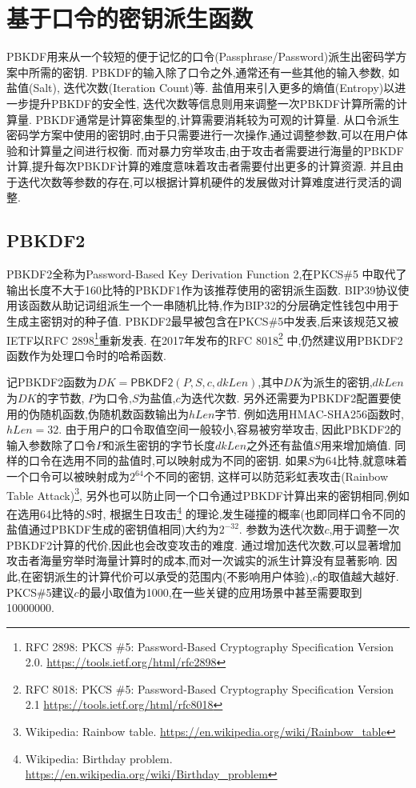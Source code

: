 
\section{基于口令的密钥派生函数}

PBKDF用来从一个较短的便于记忆的口令(Passphrase/Password)派生出密码学方案中所需的密钥.
PBKDF的输入除了口令之外,通常还有一些其他的输入参数, 如盐值(Salt), 迭代次数(Iteration Count)等.
盐值用来引入更多的熵值(Entropy)以进一步提升PBKDF的安全性, 迭代次数等信息则用来调整一次PBKDF计算所需的计算量.
PBKDF通常是计算密集型的,计算需要消耗较为可观的计算量.
从口令派生密码学方案中使用的密钥时,由于只需要进行一次操作,通过调整参数,可以在用户体验和计算量之间进行权衡.
而对暴力穷举攻击,由于攻击者需要进行海量的PBKDF计算,提升每次PBKDF计算的难度意味着攻击者需要付出更多的计算资源.
并且由于迭代次数等参数的存在,可以根据计算机硬件的发展做对计算难度进行灵活的调整.

\subsection{PBKDF2}
PBKDF2全称为Password-Based Key Derivation Function 2,在PKCS\#5
中取代了输出长度不大于160比特的PBKDF1作为该推荐使用的密钥派生函数.
BIP39协议使用该函数从助记词组派生一个一串随机比特,作为BIP32的分层确定性钱包中用于生成主密钥对的种子值.
PBKDF2最早被包含在PKCS\#5中发表,后来该规范又被IETF以RFC 
2898\footnote{
RFC 2898: PKCS \#5: Password-Based Cryptography Specification Version 2.0.
\url{https://tools.ietf.org/html/rfc2898}}重新发表.
在2017年发布的RFC 8018\footnote{
RFC 8018: PKCS \#5: Password-Based Cryptography Specification Version 2.1 \url{https://tools.ietf.org/html/rfc8018}}
中,仍然建议用PBKDF2函数作为处理口令时的哈希函数.

记PBKDF2函数为$DK = \textsf{PBKDF2}(P, S, c, dkLen)$,其中$DK$为派生的密钥,$dkLen$为$DK$的字节数,
$P$为口令,$S$为盐值,$c$为迭代次数.
另外还需要为\textsf{PBKDF2}配置要使用的伪随机函数,伪随机数函数输出为$hLen$字节.
例如选用\textsf{HMAC-SHA256}函数时, $hLen = 32$.
由于用户的口令取值空间一般较小,容易被穷举攻击,
因此PBKDF2的输入参数除了口令$P$和派生密钥的字节长度$dkLen$之外还有盐值$S$用来增加熵值.
同样的口令在选用不同的盐值时,可以映射成为不同的密钥.
如果$S$为64比特,就意味着一个口令可以被映射成为$2^{64}$个不同的密钥,
这样可以防范彩虹表攻击(Rainbow Table Attack)\footnote{
Wikipedia: Rainbow table. \url{https://en.wikipedia.org/wiki/Rainbow_table}},
另外也可以防止同一个口令通过PBKDF计算出来的密钥相同,例如在选用64比特的$S$时,
根据生日攻击\footnote{
Wikipedia: Birthday problem. \url{https://en.wikipedia.org/wiki/Birthday_problem}}
的理论,发生碰撞的概率(也即同样口令不同的盐值通过PBKDF生成的密钥值相同)大约为$2^{-32}$.
参数为迭代次数$c$,用于调整一次\textsf{PBKDF2}计算的代价,因此也会改变攻击的难度.
通过增加迭代次数,可以显著增加攻击者海量穷举时海量计算时的成本,而对一次诚实的派生计算没有显著影响.
因此,在密钥派生的计算代价可以承受的范围内(不影响用户体验),$c$的取值越大越好.
PKCS\#5建议$c$的最小取值为1000,在一些关键的应用场景中甚至需要取到10000000.


